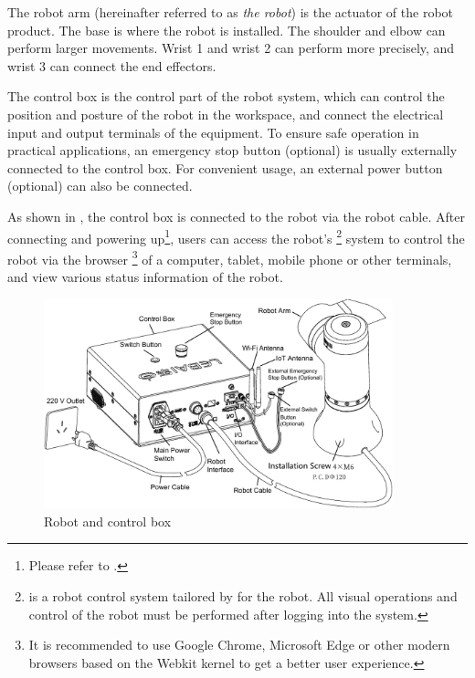 The robot arm (hereinafter referred to as {\itshape the robot}) is the actuator of the robot product. The base is where the robot is installed. The shoulder and elbow can perform larger movements. Wrist 1 and wrist 2 can perform more precisely, and wrist 3 can connect the end effectors.


The control box is the control part of the robot system, which can control the position and posture of the robot in the workspace, and connect the electrical input and output terminals of the equipment. %
To ensure safe operation in practical applications, an emergency stop button (optional) is usually externally connected to the control box. %
For convenient usage, an external power button (optional) can also be connected.

As shown in , the control box is connected to the robot via the robot cable. After connecting and powering up\footnote{Please refer to .}, users can access the robot's \LM \footnote{\LM is a robot control system tailored by {\TheCompany} for the robot. All visual operations and control of the robot must be performed after logging into the \LM system.} system  to control the robot via the browser \footnote{It is recommended to use Google Chrome, Microsoft Edge or other modern browsers based on the Webkit kernel to get a better user experience.} of a computer, tablet, mobile phone or other terminals, and view various status information of the robot.

\begin{figure}[h!]
    \centering
    \includegraphics[width=0.9\textwidth]{en/image/robot_links.pdf}
    \caption{Robot and control box}
    \label{fig:机器人本体及控制箱连接}
\end{figure}

